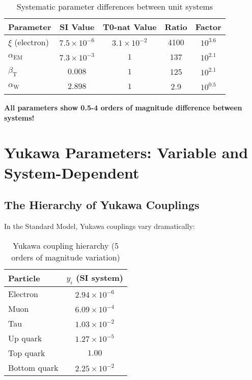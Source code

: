 \documentclass[12pt,a4paper]{article}
\newcommand{\xipar}{\xi}
\begin{document}
	\begin{table}[htbp]
		\centering
		\begin{tabular}{lcccc}
			\toprule
			\textbf{Parameter} & \textbf{SI Value} & \textbf{T0-nat Value} & \textbf{Ratio} & \textbf{Factor} \\
			\midrule
			$\xipar$ (electron) & $7.5 \times 10^{-6}$ & $3.1 \times 10^{-2}$ & 4100 & $10^{3.6}$ \\
			$\alpha_{\text{EM}}$ & $7.3 \times 10^{-3}$ & $1$ & 137 & $10^{2.1}$ \\
			$\beta_{\text{T}}$ & $0.008$ & $1$ & 125 & $10^{2.1}$ \\
			$\alpha_{\text{W}}$ & $2.898$ & $1$ & 2.9 & $10^{0.5}$ \\
			\bottomrule
		\end{tabular}
		\caption{Systematic parameter differences between unit systems}
		\label{tab:parameter_comparison}
	\end{table}
	
	\textbf{All parameters show 0.5-4 orders of magnitude difference between systems!}
	
	\section{Yukawa Parameters: Variable and System-Dependent}
	\label{sec:yukawa_parameters}
	
	\subsection{The Hierarchy of Yukawa Couplings}
	\label{subsec:yukawa_hierarchy}
	
	In the Standard Model, Yukawa couplings vary dramatically:
	
	\begin{table}[htbp]
		\centering
		\begin{tabular}{lc}
			\toprule
			\textbf{Particle} & \textbf{$y_i$ (SI system)} \\
			\midrule
			Electron & $2.94 \times 10^{-6}$ \\
			Muon & $6.09 \times 10^{-4}$ \\
			Tau & $1.03 \times 10^{-2}$ \\
			Up quark & $1.27 \times 10^{-5}$ \\
			Top quark & $1.00$ \\
			Bottom quark & $2.25 \times 10^{-2}$ \\
			\bottomrule
		\end{tabular}
		\caption{Yukawa coupling hierarchy (5 orders of magnitude variation)}
		\label{tab:yukawa_hierarchy}
	\end{table}
	
\end{document}

